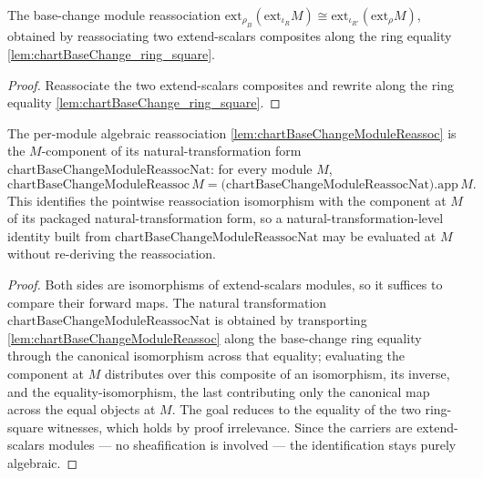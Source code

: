 \begin{lemma}
  \label{lem:chartBaseChangeModuleReassoc}
  The base-change module reassociation
  \(\mathrm{ext}_{\rho_B}(\mathrm{ext}_{\iota_R}M)\cong\mathrm{ext}_{\iota_{R'}}(\mathrm{ext}_{\rho}M)\),
  obtained by reassociating two extend-scalars composites along the ring equality
  \cref{lem:chartBaseChange_ring_square}.
  \begin{proof}
    Reassociate the two extend-scalars composites and rewrite along the ring equality
    \cref{lem:chartBaseChange_ring_square}.
  \end{proof}
\end{lemma}

\begin{lemma}


  \label{lem:chartBaseChangeModuleReassoc_eq_natApp}
  The per-module algebraic reassociation \cref{lem:chartBaseChangeModuleReassoc} is the \(M\)-component
  of its natural-transformation form \(\mathrm{chartBaseChangeModuleReassocNat}\): for every module
  \(M\),
  \[
    \mathrm{chartBaseChangeModuleReassoc}\,M
      = \bigl(\mathrm{chartBaseChangeModuleReassocNat}\bigr).\mathrm{app}\,M .
  \]
  This identifies the pointwise reassociation isomorphism with the component at \(M\) of its packaged
  natural-transformation form, so a natural-transformation-level identity built from
  \(\mathrm{chartBaseChangeModuleReassocNat}\) may be evaluated at \(M\) without re-deriving the
  reassociation.
  \begin{proof}
    Both sides are isomorphisms of extend-scalars modules, so it suffices to compare their forward
    maps. The natural transformation \(\mathrm{chartBaseChangeModuleReassocNat}\) is obtained by
    transporting \cref{lem:chartBaseChangeModuleReassoc} along the base-change ring equality through
    the canonical isomorphism across that equality; evaluating the component at \(M\) distributes over
    this composite of an isomorphism, its inverse, and the equality-isomorphism, the last contributing
    only the canonical map across the equal objects at \(M\). The goal reduces to the equality of the
    two ring-square witnesses, which holds by proof irrelevance. Since the carriers are extend-scalars
    modules — no sheafification is involved — the identification stays purely algebraic.
  \end{proof}
\end{lemma}

